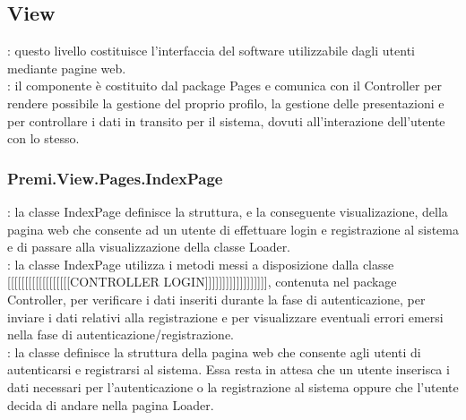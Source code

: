 	\begin{figure}
	\end{figure}
	\subsection{View}{
		\textbf{\tipo}: questo livello costituisce l'interfaccia del software utilizzabile dagli utenti mediante pagine web.\\
		\textbf{\relaz}: il componente è costituito dal package Pages e comunica con il Controller per rendere possibile la gestione del proprio profilo, la gestione delle presentazioni e per controllare i dati in transito per il sistema, dovuti all'interazione dell'utente con lo stesso.\\
		\subsubsection{Premi.View.Pages.IndexPage}{
			\textbf{\tipo}: la classe IndexPage definisce la struttura, e la conseguente visualizazione, della pagina web che consente ad un utente di effettuare login e registrazione al sistema e di passare alla visualizzazione della classe Loader.\\
			\textbf{\relaz}: la classe IndexPage utilizza i metodi messi a disposizione dalla classe [[[[[[[[[[[[[[[[[[CONTROLLER LOGIN]]]]]]]]]]]]]]]]]], contenuta nel package Controller, per verificare i dati inseriti durante la fase di autenticazione, per inviare i dati relativi alla registrazione e per visualizzare eventuali errori emersi nella fase di autenticazione/registrazione.\\
			\textbf{\attivita}: la classe definisce la struttura della pagina web che consente agli utenti di autenticarsi e registrarsi al sistema. Essa resta in attesa che un utente inserisca i dati necessari per l’autenticazione o la registrazione al sistema oppure che l'utente decida di andare nella pagina Loader.\\
		}
}
